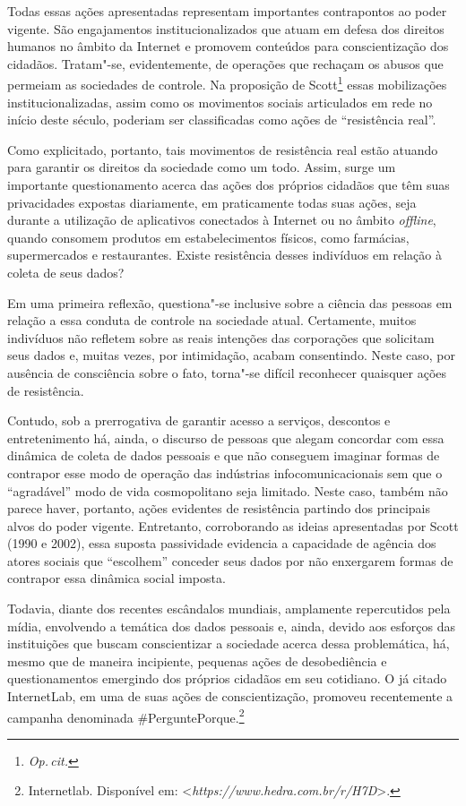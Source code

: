 Todas essas ações apresentadas representam importantes contrapontos ao
poder vigente. São engajamentos institucionalizados que atuam em defesa
dos direitos humanos no âmbito da Internet e promovem conteúdos para
conscientização dos cidadãos. Tratam"-se, evidentemente, de operações que
rechaçam os abusos que permeiam as sociedades de controle. Na proposição
de Scott\footnote{\textit{Op.\,cit.}} essas mobilizações
institucionalizadas, assim como os movimentos sociais articulados em
rede no início deste século, poderiam ser classificadas como ações de
``resistência real''.

Como explicitado, portanto, tais movimentos de resistência real estão
atuando para garantir os direitos da sociedade como um todo. Assim,
surge um importante questionamento acerca das ações dos próprios
cidadãos que têm suas privacidades expostas diariamente, em praticamente
todas suas ações, seja durante a utilização de aplicativos conectados à
Internet ou no âmbito \emph{offline}, quando consomem produtos em
estabelecimentos físicos, como farmácias, supermercados e restaurantes.
Existe resistência desses indivíduos em relação à coleta de seus dados?

Em uma primeira reflexão, questiona"-se inclusive sobre a ciência das
pessoas em relação a essa conduta de controle na sociedade atual.
Certamente, muitos indivíduos não refletem sobre as reais intenções das
corporações que solicitam seus dados e, muitas vezes, por intimidação,
acabam consentindo. Neste caso, por ausência de consciência sobre o
fato, torna"-se difícil reconhecer quaisquer ações de resistência.

Contudo, sob a prerrogativa de garantir acesso a serviços, descontos e
entretenimento há, ainda, o discurso de pessoas que alegam concordar com
essa dinâmica de coleta de dados pessoais e que não conseguem imaginar
formas de contrapor esse modo de operação das indústrias
infocomunicacionais sem que o ``agradável'' modo de vida cosmopolitano
seja limitado. Neste caso, também não parece haver, portanto, ações
evidentes de resistência partindo dos principais alvos do poder vigente.
Entretanto, corroborando as ideias apresentadas por Scott (1990 e 2002),
essa suposta passividade evidencia a capacidade de agência dos atores
sociais que ``escolhem'' conceder seus dados por não enxergarem formas
de contrapor essa dinâmica social imposta.

Todavia, diante dos recentes escândalos mundiais, amplamente
repercutidos pela mídia, envolvendo a temática dos dados pessoais e,
ainda, devido aos esforços das instituições que buscam conscientizar a
sociedade acerca dessa problemática, há, mesmo que de maneira
incipiente, pequenas ações de desobediência e questionamentos emergindo
dos próprios cidadãos em seu cotidiano. O já citado InternetLab, em uma
de suas ações de conscientização, promoveu recentemente a campanha
denominada \#PerguntePorque.\footnote{Internetlab. Disponível em: \textless{}\emph{https://www.hedra.com.br/r/H7D}\textgreater{}.}

